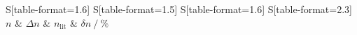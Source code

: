 \begin{table}
    \centering
    \caption{Messergebnisse.}
    \label{tab:4}
    \begin{tabular}{
	S[table-format=1.6]
	S[table-format=1.5]
	S[table-format=1.6]
	S[table-format=2.3]
	}
	\toprule
	{$n$}		& {$\Delta n$}		& 
	{$n_{\text{lit}}$}		& {$\delta n \:/\: \si{\percent}$}		\\ 
	\midrule
    
    \bottomrule
    \end{tabular}
    \end{table}
